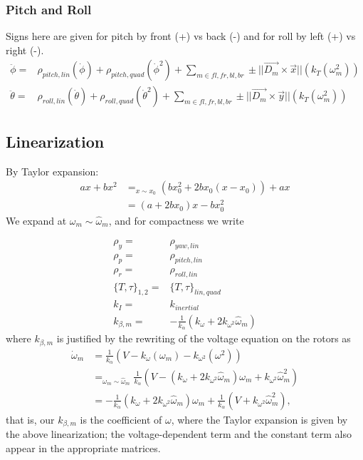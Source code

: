 \documentclass{article}
\begin{document}
\subsubsection{Pitch and Roll}
Signs here are given for pitch by front (+) vs back (-) and for roll by left (+) vs right (-). 
\begin{equation}
\begin{aligned}
    \ddot{\phi} =& \rho_{pitch,lin}(\dot{\phi}) + \rho_{pitch,quad}(\dot{\phi}^2) + \sum_{m \in fl, fr, bl, br} \pm ||\vec{D_m} \times \vec{x}||\left(k_T(\omega_{m}^2)\right)\\
    \ddot{\theta} =& \rho_{roll,lin}(\dot{\theta}) + \rho_{roll,quad}(\dot{\theta}^2) + \sum_{m \in fl, fr, bl, br} \pm ||\vec{D_m} \times \vec{y}||\left(k_T(\omega_{m}^2)\right)
\end{aligned}
\end{equation}

\subsection{Linearization}
By Taylor expansion:
\begin{equation}
\begin{aligned}
    ax + bx^2 &=_{x \sim x_0} (bx_0^2 + 2bx_0(x-x_0)) + ax\\
    &= (a + 2bx_0)x - bx_0^2
\end{aligned}
\end{equation}
We expand at $\omega_m \sim \widehat{\omega}_m$, and for compactness we write

\begin{align*}
    \rho_y =& \rho_{yaw,lin}\\
    \rho_p =& \rho_{pitch,lin}\\
    \rho_r =& \rho_{roll,lin}\\
    \{T, \tau\}_{1, 2} =& \{T, \tau\}_{lin, quad}\\
    k_I =& k_{inertial} \\
    k_{\beta, m} =& -\frac{1}{k_\alpha} \left(k_\omega + 2 k_{\omega^2} \widehat{\omega}_m \right)
\end{align*}
where $k_{\beta, m}$ is justified by the rewriting of the voltage equation on the rotors as
\begin{equation}
    \begin{aligned}
     \dot{\omega}_m &= \frac{1}{k_\alpha} \left(V - k_\omega(\omega_m) - k_{\omega^2}(\omega^2)\right)\\
     &=_{\omega_m \sim \widehat{\omega}_m} \frac{1}{k_\alpha} \left( V - \left(k_\omega + 2 k_{\omega^2}\widehat{\omega}_m\right) \omega_m + k_{\omega^2}\widehat{\omega}_m^2 \right)\\
     &= - \frac{1}{k_\alpha} \left(k_\omega + 2 k_{\omega^2}\widehat{\omega}_m\right) \omega_m + \frac{1}{k_\alpha} \left( V + k_{\omega^2}\widehat{\omega}_m^2 \right),
    \end{aligned}
\end{equation}
that is, our $k_{\beta, m}$ is the coefficient of $\omega$, where the Taylor expansion is given by the above linearization; the voltage-dependent term and the constant term also appear in the appropriate matrices.
\end{document}
